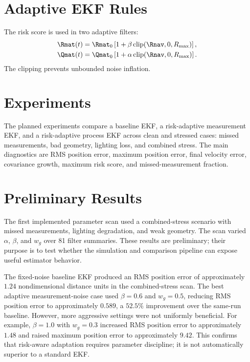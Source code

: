 \documentclass[11pt]{article}
\begin{document}
\section{Adaptive EKF Rules}

The risk score is used in two adaptive filters:
\begin{align}
  \Rmat(t) &= \Rmat_0\left[1+\beta\,\mathrm{clip}(\Rnav,0,R_{\max})\right],\\
  \Qmat(t) &= \Qmat_0\left[1+\alpha\,\mathrm{clip}(\Rnav,0,R_{\max})\right].
\end{align}
The clipping prevents unbounded noise inflation.

\section{Experiments}

The planned experiments compare a baseline EKF, a risk-adaptive measurement
EKF, and a risk-adaptive process EKF across clean and stressed cases:
missed measurements, bad geometry, lighting loss, and combined stress. The
main diagnostics are RMS position error, maximum position error, final velocity
error, covariance growth, maximum risk score, and missed-measurement fraction.

\section{Preliminary Results}

The first implemented parameter scan used a combined-stress scenario with
missed measurements, lighting degradation, and weak geometry. The scan varied
$\alpha$, $\beta$, and $w_g$ over 81 filter summaries. These results are
preliminary; their purpose is to test whether the simulation and comparison
pipeline can expose useful estimator behavior.

The fixed-noise baseline EKF produced an RMS position error of approximately
$1.24$ nondimensional distance units in the combined-stress scan. The best
adaptive measurement-noise case used $\beta=0.6$ and $w_g=0.5$, reducing RMS
position error to approximately $0.589$, a $52.5\%$ improvement over the
same-run baseline. However, more aggressive settings were not uniformly
beneficial. For example, $\beta=1.0$ with $w_g=0.3$ increased RMS position
error to approximately $1.48$ and raised maximum position error to
approximately $9.42$. This confirms that risk-aware adaptation requires
parameter discipline; it is not automatically superior to a standard EKF.
\end{document}
